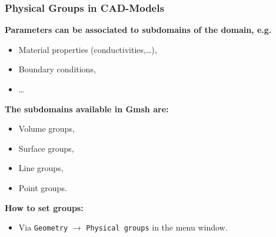 \begin{frame}
  \frametitle<presentation>{Physical Groups in CAD-Models}
  \begin{minipage}{0.67\linewidth}
    \textbf{Parameters can be associated to subdomains of the
    domain, e.g.}
    \begin{itemize}
      \item Material properties (conductivities,\ldots),
      \item Boundary conditions,
      \item \ldots
    \end{itemize}
    \textbf{The subdomains available in Gmsh are:}
    \begin{itemize}
      \item Volume groups,
      \item Surface groups,
      \item Line groups,
      \item Point groups.
    \end{itemize}
    \textbf{How to set groups:}
    \begin{itemize}
      \item Via \texttt{Geometry} $\rightarrow$ \texttt{Physical groups} in
        the menu window.
    \end{itemize}
  \end{minipage}
  \hfill
  \begin{minipage}{0.31\linewidth}
    \begin{center}

\end{center}
\end{minipage}
\end{frame}
